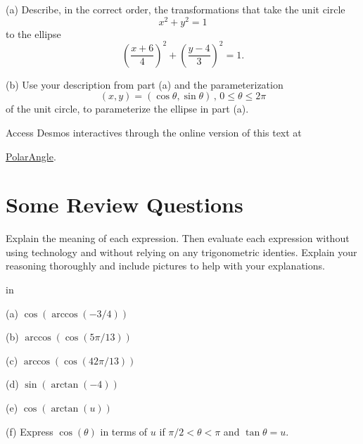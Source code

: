 \documentclass{ximera}
\newcommand{\pskip}{\vskip 0.1 in}
\begin{document}
\begin{question} \label{Qetfg8uijjg}
(a) Describe, in the correct order, the transformations that take the unit circle
\[
  x^2 +y^2 = 1
\]
to the ellipse
\[
  \left( \frac{x+6}{4} \right)^2 + \left( \frac{y-4}{3} \right)^2 = 1.
\]

(b) Use your description from part (a) and the parameterization
\[
   ( x, y)  = ( \cos \theta , \sin\theta)  \, , \, 0\leq \theta \leq 2\pi
\]
of the unit circle, to parameterize the ellipse in part (a). 


 \begin{exploration}
\begin{onlineOnly}
    \begin{center}
\end{center}
\end{onlineOnly}


Access Desmos interactives through the online version of this text at
 
\href{https://www.desmos.com/calculator/balmyutbjj}{PolarAngle}.

\end{exploration}

\end{question}





\section{Some Review Questions}

\begin{question}   \label{Q17:InverseTrig}
Explain the meaning of each expression. Then evaluate each expression without using technology and without relying on any trigonometric identies. Explain your reasoning thoroughly and include pictures to help with your explanations.

\pskip

(a) $\cos (\arccos(-3/4))$ 

(b) $\arccos(\cos (5\pi/13))$

(c) $\arccos(\cos (42\pi/13))$

(d) $\sin(\arctan (-4))$

(e) $\cos(\arctan (u))$

(f) Express $\cos (\theta)$ in terms of $u$  if $\pi/2 < \theta < \pi$ and $\tan \theta=u$.

\end{question} 
\end{document}
